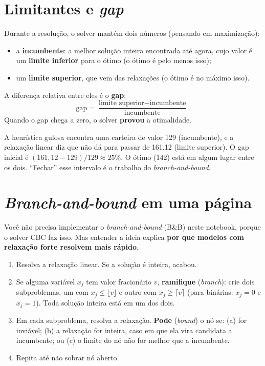 \section{Limitantes e \emph{gap}}

Durante a resolução, o solver mantém dois números (pensando em maximização):
\begin{itemize}
  \item a \textbf{incumbente}: a melhor solução inteira encontrada até agora, cujo valor é um \textbf{limite
  inferior} para o ótimo (o ótimo é pelo menos isso);
  \item um \textbf{limite superior}, que vem das relaxações (o ótimo é no máximo isso).
\end{itemize}
A diferença relativa entre eles é o \textbf{gap}:
\[
\text{gap} = \frac{\text{limite superior} - \text{incumbente}}{\text{incumbente}}.
\]
Quando o gap chega a zero, o solver \textbf{provou} a otimalidade.

\begin{exemplo}
A heurística gulosa encontra uma carteira de valor 129 (incumbente), e a relaxação linear diz que não dá para passar
de 161,12 (limite superior). O gap inicial é $(161{,}12-129)/129\approx 25\%$. O ótimo (142) está em algum lugar
entre os dois. ``Fechar'' esse intervalo é o trabalho do \emph{branch-and-bound}.
\end{exemplo}

\section{\emph{Branch-and-bound} em uma página}
\label{sec:bb}

Você não precisa implementar o \emph{branch-and-bound} (B\&B) neste notebook, porque o solver CBC faz isso. Mas
entender a ideia explica \textbf{por que modelos com relaxação forte resolvem mais rápido}.

\begin{enumerate}
  \item Resolva a relaxação linear. Se a solução é inteira, acabou.
  \item Se alguma variável $x_j$ tem valor fracionário $v$, \textbf{ramifique} (\emph{branch}): crie dois
  subproblemas, um com $x_j\le\lfloor v\rfloor$ e outro com $x_j\ge\lceil v\rceil$ (para binárias: $x_j=0$ e
  $x_j=1$). Toda solução inteira está em um dos dois.
  \item Em cada subproblema, resolva a relaxação. \textbf{Pode} (\emph{bound}) o nó se: (a) for inviável; (b) a
  relaxação for inteira, caso em que ela vira candidata a incumbente; ou (c) o limite do nó não for melhor que a
  incumbente.
  \item Repita até não sobrar nó aberto.
\end{enumerate}

